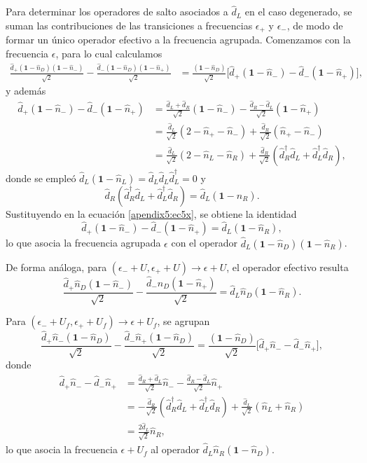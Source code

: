 \begin{appendixs}
Para determinar los operadores de salto asociados a \(\hat{d}_{L}\) en el caso degenerado, se suman las contribuciones de las transiciones a frecuencias \(\epsilon_{+}\) y \(\epsilon_{-}\), de modo de formar un único operador efectivo a la frecuencia agrupada. Comenzamos con la frecuencia \(\epsilon\), para lo cual calculamos
\begin{align*}
\frac{\hat{d}_{+}(\mathbf{1}-\hat{n}_{D})(\mathbf{1}-\hat{n}_{-})}{\sqrt{2}}
-\frac{\hat{d}_{-}(\mathbf{1}-\hat{n}_{D})(\mathbf{1}-\hat{n}_{+})}{\sqrt{2}}
&=\frac{(\mathbf{1}-\hat{n}_{D})}{\sqrt{2}}\Big[\hat{d}_{+}(\mathbf{1}-\hat{n}_{-})
- \hat{d}_{-}(\mathbf{1}-\hat{n}_{+})\Big],
\end{align*}
y además
\begin{align}
\hat{d}_{+}(\mathbf{1}-\hat{n}_{-})-\hat{d}_{-}(\mathbf{1}-\hat{n}_{+})
&=\frac{\hat{d}_{L}+\hat{d}_{R}}{\sqrt{2}}(\mathbf{1}-\hat{n}_{-})
-\frac{\hat{d}_{R}-\hat{d}_{L}}{\sqrt{2}}(\mathbf{1}-\hat{n}_{+})\nonumber\\
&=\frac{\hat{d}_{L}}{\sqrt{2}}(2-\hat{n}_{+}-\hat{n}_{-})
+\frac{\hat{d}_{R}}{\sqrt{2}}(\hat{n}_{+}-\hat{n}_{-})\nonumber\\
&=\frac{\hat{d}_{L}}{\sqrt{2}}(2-\hat{n}_{L}-\hat{n}_{R})
+\frac{\hat{d}_{R}}{\sqrt{2}}(\hat{d}^{\dagger}_{R}\hat{d}_{L}+\hat{d}^{\dagger}_{L}\hat{d}_{R}),
\label{apendix5:ec5x}
\end{align}
donde se empleó \(\hat{d}_{L}(\mathbf{1}-\hat{n}_{L})=\hat{d}_{L}\hat{d}_{L}\hat{d}^{\dagger}_{L}=0\) y
\[
\hat{d}_{R}(\hat{d}^{\dagger}_{R}\hat{d}_{L}+\hat{d}^{\dagger}_{L}\hat{d}_{R})
=\hat{d}_{L}(\mathbf{1}-\hat{n}_{R}).
\]
Sustituyendo en la ecuación \eqref{apendix5:ec5x}, se obtiene la identidad
\[
\hat{d}_{+}(\mathbf{1}-\hat{n}_{-})-\hat{d}_{-}(\mathbf{1}-\hat{n}_{+})
=\hat{d}_{L}(\mathbf{1}-\hat{n}_{R}),
\]
lo que asocia la frecuencia agrupada \(\epsilon\) con el operador
\(\hat{d}_{L}(\mathbf{1}-\hat{n}_{D})(\mathbf{1}-\hat{n}_{R})\).

De forma análoga, para \((\epsilon_{-}+U,\epsilon_{+}+U)\to \epsilon+U\), el operador efectivo resulta
\[
\frac{\hat{d}_{+}\hat{n}_{D}(\mathbf{1}-\hat{n}_{-})}{\sqrt{2}}
-\frac{\hat{d}_{-}\hat{n}_{D}(\mathbf{1}-\hat{n}_{+})}{\sqrt{2}}
=\hat{d}_{L}\hat{n}_{D}(\mathbf{1}-\hat{n}_{R}).
\]

Para \((\epsilon_{-}+U_{f},\epsilon_{+}+U_{f})\to \epsilon+U_{f}\), se agrupan
\[
\frac{\hat{d}_{+}\hat{n}_{-}(\mathbf{1}-\hat{n}_{D})}{\sqrt{2}}
-\frac{\hat{d}_{-}\hat{n}_{+}(\mathbf{1}-\hat{n}_{D})}{\sqrt{2}}
=\frac{(\mathbf{1}-\hat{n}_{D})}{\sqrt{2}}\big[\hat{d}_{+}\hat{n}_{-}-\hat{d}_{-}\hat{n}_{+}\big],
\]
donde
\begin{align*}
\hat{d}_{+}\hat{n}_{-}-\hat{d}_{-}\hat{n}_{+}
&=\frac{\hat{d}_{R}+\hat{d}_{L}}{\sqrt{2}}\hat{n}_{-}
-\frac{\hat{d}_{R}-\hat{d}_{L}}{\sqrt{2}}\hat{n}_{+}\\
&=-\frac{\hat{d}_{R}}{\sqrt{2}}(\hat{d}^{\dagger}_{R}\hat{d}_{L}+\hat{d}^{\dagger}_{L}\hat{d}_{R})
+\frac{\hat{d}_{L}}{\sqrt{2}}(\hat{n}_{L}+\hat{n}_{R})\\
&=\frac{2\hat{d}_{L}}{\sqrt{2}}\hat{n}_{R},
\end{align*}
lo que asocia la frecuencia \(\epsilon+U_{f}\) al operador
\(\hat{d}_{L}\hat{n}_{R}(\mathbf{1}-\hat{n}_{D})\).


\end{appendixs}
